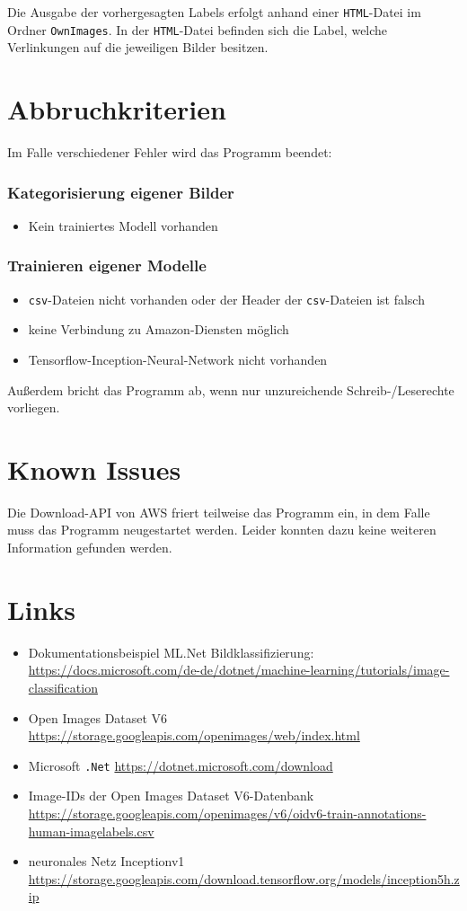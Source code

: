 \documentclass[doktyp=parbeit]{TUBAFarbeiten}
\begin{document}
Die Ausgabe der vorhergesagten Labels erfolgt anhand einer \texttt{HTML}-Datei im Ordner \texttt{OwnImages}. In der \texttt{HTML}-Datei befinden sich die Label, welche Verlinkungen auf die jeweiligen Bilder besitzen.
\section{Abbruchkriterien}
Im Falle verschiedener Fehler wird das Programm beendet:
\subsubsection*{Kategorisierung eigener Bilder}
\begin{itemize}
	\item Kein trainiertes Modell vorhanden
\end{itemize}
\subsubsection*{Trainieren eigener Modelle}	
\begin{itemize}
	\item \texttt{csv}-Dateien nicht vorhanden oder der Header der \texttt{csv}-Dateien ist falsch
	\item keine Verbindung zu Amazon-Diensten möglich
	\item Tensorflow-Inception-Neural-Network nicht vorhanden
\end{itemize}
Außerdem bricht das Programm ab, wenn nur unzureichende Schreib-/Leserechte vorliegen.  
\section{Known Issues}
Die Download-API von AWS friert teilweise das Programm ein, in dem Falle muss das Programm neugestartet werden. Leider konnten dazu keine weiteren Information gefunden werden. 
\section{Links}
\begin{itemize}
	\item Dokumentationsbeispiel ML.Net Bildklassifizierung: \url{https://docs.microsoft.com/de-de/dotnet/machine-learning/tutorials/image-classification}
	\item Open Images Dataset V6 \url{https://storage.googleapis.com/openimages/web/index.html}
	\item Microsoft \texttt{.Net} \url{https://dotnet.microsoft.com/download}
	\item Image-IDs der Open Images Dataset V6-Datenbank \url{https://storage.googleapis.com/openimages/v6/oidv6-train-annotations-human-imagelabels.csv}
	\item neuronales Netz Inceptionv1 \url{https://storage.googleapis.com/download.tensorflow.org/models/inception5h.zip}
\end{itemize}
\end{document}
